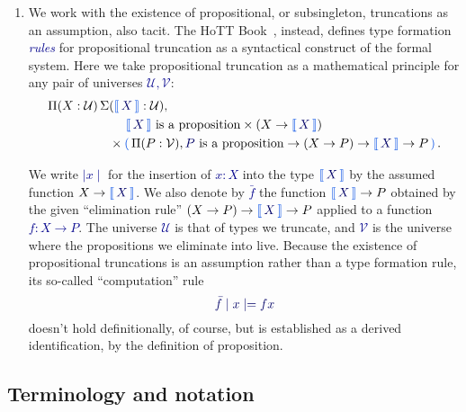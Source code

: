 \documentclass[10pt]{article}
\makeatletter
\newcommand{\db}{\textcolor{darkblue}}
\newcommand\leftcolor[2]{%
  \edef\@tempa{#1}%
  \ifx\@tempa\@empty
    \edef\@tempa{darkblue}%
  \fi
 \mathinner\bgroup\begingroup\color{\@tempa}\left#2\normalcolor%
}
\newcommand\rightcolor[2]{%
  \edef\@tempa{#1}%
  \ifx\@tempa\@empty
    \edef\@tempa{darkblue}%
  \fi
  \color{\@tempa}\right#2\endgroup\egroup%
}
\newcommand{\bracket}[1]{\leftcolor{darkgreen}(\,#1\,\rightcolor{darkgreen})}
\newcommand{\trunc}[1]{\leftcolor{darkgreen}\llbracket\,\db{#1}\,\rightcolor{darkgreen}\rrbracket}
\newcommand{\df}[1]{\emph{\db{#1}}}
\newcommand{\m}[1]{\db{$#1$}}
\newcommand{\M}[1]{\[\db{#1}\]}
\newcommand{\U}{\mathcal{U}}
\newcommand{\V}{\mathcal{V}}
\theoremstyle{definition}
\makeatother
\begin{document}
\begin{enumerate}
\item We work with the existence of propositional, or subsingleton, truncations as an
  assumption, also tacit.  The HoTT Book~\cite{hottbook}, instead,
  defines type formation \df{rules} for propositional truncation as a
  syntactical construct of the formal system. Here we take
  propositional truncation as a mathematical principle for any pair of
  universes \m{\U,\V}: \db{
    \begin{align*}
      \Pi (X:\U)\,  \Sigma & (\trunc{X}  : \U), \\
      & \mathrel{\phantom{\times}} \text{\m{\trunc{X}} is a proposition} \times (X \to \trunc{X}) \\
  & \times \bracket{\Pi (P : \V), \text{\m{P} is a proposition} \to (X \to P) \to \trunc{X} \to P}.
    \end{align*}}

  We write \m{\mid x \mid} for the insertion of \m{x:X} into the type
  \m{\trunc{X}} by the assumed function \m{X \to \trunc{X}}.  We also
  denote by \m{\bar{f}} the function \m{\trunc{X} \to P} obtained by
  the given ``elimination rule'' \m{(X \to P) \to \trunc{X} \to P}
  applied to a function \m{f:X \to P}. The universe \m{\U} is that of
  types we truncate, and \m{\V} is the universe where the propositions
  we eliminate into live.  Because the existence of propositional
  truncations is an assumption rather than a type formation rule, its
  so-called ``computation'' rule \M{\bar{f} \mid x \mid = f x} doesn't
  hold definitionally, of course, but is established as a derived
  identification, by the definition of proposition.

\end{enumerate}


\subsection{Terminology and notation}
\label{existence:terminology}
\end{document}
